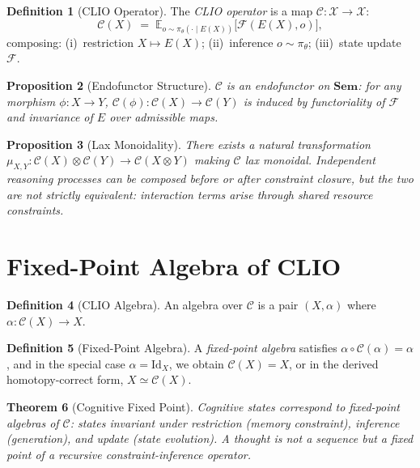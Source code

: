 \documentclass[11pt, letterpaper]{article}
\theoremstyle{plain}
\newtheorem{theorem}{Theorem}[section]
\newtheorem{proposition}[theorem]{Proposition}
\theoremstyle{definition}
\newtheorem{definition}[theorem]{Definition}
\theoremstyle{remark}
\newcommand{\CC}{\mathcal{C}}
\newcommand{\Sem}{\mathbf{Sem}}
\newcommand{\Id}{\mathrm{Id}}
\begin{document}
\begin{definition}[CLIO Operator]
The \emph{CLIO operator} is a map $\CC : \mathcal{X} \to \mathcal{X}$:
\[
  \CC(X) \;=\; \mathbb{E}_{o \sim \pi_\theta(\cdot \mid E(X))}\bigl[\mathcal{F}(E(X), o)\bigr],
\]
composing: (i)~restriction $X \mapsto E(X)$; (ii)~inference $o \sim \pi_\theta$;
(iii)~state update $\mathcal{F}$.
\end{definition}

\begin{proposition}[Endofunctor Structure]
$\CC$ is an endofunctor on $\Sem$: for any morphism $\phi: X \to Y$,
$\CC(\phi): \CC(X) \to \CC(Y)$ is induced by functoriality of $\mathcal{F}$ and
invariance of $E$ over admissible maps.
\end{proposition}

\begin{proposition}[Lax Monoidality]
There exists a natural transformation
$\mu_{X,Y}: \CC(X) \otimes \CC(Y) \to \CC(X \otimes Y)$
making $\CC$ lax monoidal. Independent reasoning processes can be composed before or
after constraint closure, but the two are not strictly equivalent: interaction terms
arise through shared resource constraints.
\end{proposition}

\section{Fixed-Point Algebra of CLIO}

\begin{definition}[CLIO Algebra]
An algebra over $\CC$ is a pair $(X, \alpha)$ where $\alpha: \CC(X) \to X$.
\end{definition}

\begin{definition}[Fixed-Point Algebra]
A \emph{fixed-point algebra} satisfies $\alpha \circ \CC(\alpha) = \alpha$, and in the
special case $\alpha = \Id_X$, we obtain $\CC(X) = X$, or in the derived homotopy-correct
form, $X \simeq \CC(X)$.
\end{definition}

\begin{theorem}[Cognitive Fixed Point]
\label{thm:cogfixedpt}
Cognitive states correspond to fixed-point algebras of $\CC$: states invariant under
restriction (memory constraint), inference (generation), and update (state evolution).
A \emph{thought} is not a sequence but a fixed point of a recursive constraint-inference
operator.
\end{theorem}
\end{document}
